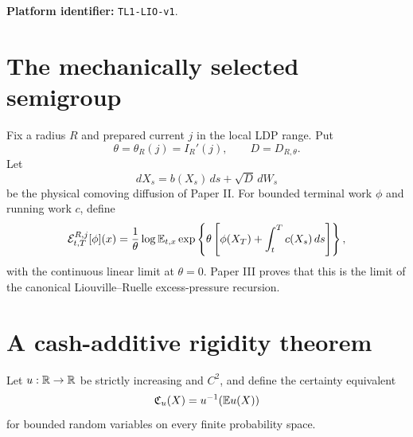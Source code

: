 
\begin{abstract}
We identify and represent the theta-semigroups derived from Liouville current
conditioning in Papers I--III.  The mechanical input determines the parameter:
$\theta=I_R'(j)$.  A separate rigidity theorem shows that, among smooth
law-invariant certainty equivalents, cash additivity and relevance leave only
the linear and exponential families; the nonzero mechanically selected field
chooses the entropic branch.

For the fixed-law physical diffusion, the terminal solution map is analytic on
bounded payoffs.  Its first derivative is expectation under a payoff-dependent
tangent probability and its second derivative is $\theta$ times covariance.
The tangent kernels satisfy a cocycle obtained by differentiating nonlinear
time consistency.  The microscopic Doob/Ruelle recursions carry exact tangent
path measures, and the deterministic homogenization of Paper III implies their
convergence to the diffusion tangent law.  A genuine stochastic-exponential
density gives Girsanov and quadratic/tangent BSDE representations.  Controlled
values are kept separate: their second variation contains the
optimizer-response correction from Paper IV.
\end{abstract}
\maketitle
\noindent\textbf{Platform identifier:} \texttt{TL1-LIO-v1}.

\tableofcontents

\section{The mechanically selected semigroup}\label{sec:mechanical}
Fix a radius $R$ and prepared current $j$ in the local LDP range.  Put
\[
 \theta=\theta_R(j)=I_R'(j),
 \qquad D=D_{R,\theta}.
\]
Let
\[
 dX_s=b(X_s)\,ds+\sqrt D\,dW_s
\]
be the physical comoving diffusion of Paper II.  For bounded terminal work
$\phi$ and running work $c$, define
\[
 \mathcal E_{t,T}^{R,j}[\phi](x)
 =\frac1\theta\log\mathbb E_{t,x}
 \exp\left\{\theta\left[
 \phi(X_T)+\int_t^T c(X_s)\,ds\right]\right\},
\]
with the continuous linear limit at $\theta=0$.
Paper III proves that this is the limit of the canonical Liouville--Ruelle
excess-pressure recursion.

\section{A cash-additive rigidity theorem}\label{sec:rigidity}
Let $u:\mathbb R\to\mathbb R$ be strictly increasing and $C^2$, and define the certainty
equivalent
\[
 \mathfrak C_u(X)=u^{-1}(\mathbb E u(X))
\]
for bounded random variables on every finite probability space.

